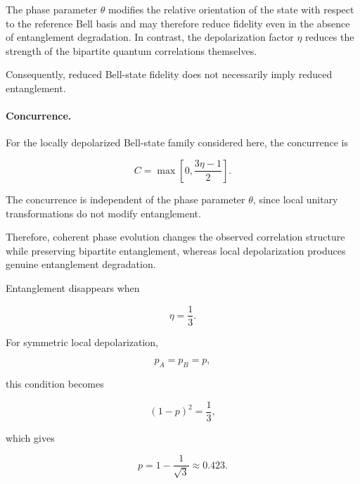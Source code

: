 \medskip

The phase parameter \( \theta \) modifies the relative orientation of the state with respect to the reference Bell basis and may therefore reduce fidelity even in the absence of entanglement degradation. In contrast, the depolarization factor \( \eta \) reduces the strength of the bipartite quantum correlations themselves.

\medskip

Consequently, reduced Bell-state fidelity does not necessarily imply reduced entanglement.

\paragraph{Concurrence.}

For the locally depolarized Bell-state family considered here, the concurrence is

\begin{equation}
C
=
\max
\left[
0,
\frac{3\eta-1}{2}
\right].
\label{eq:composite_channel_concurrence}
\end{equation}

The concurrence is independent of the phase parameter \( \theta \), since local unitary transformations do not modify entanglement.

\medskip

Therefore, coherent phase evolution changes the observed correlation structure while preserving bipartite entanglement, whereas local depolarization produces genuine entanglement degradation.

\medskip

Entanglement disappears when

\begin{equation}
\eta
=
\frac{1}{3}.
\label{eq:entanglement_threshold_eta}
\end{equation}

For symmetric local depolarization,

\[
p_A=p_B=p,
\]

this condition becomes

\begin{equation}
(1-p)^2
=
\frac{1}{3},
\end{equation}

which gives

\begin{equation}
p
=
1-\frac{1}{\sqrt{3}}
\approx
0.423.
\end{equation}

\medskip

